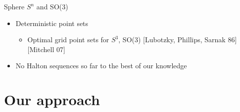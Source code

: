 \documentclass[10pt,ignorenonframetext,serif,onlymath]{beamer}
\providecommand{\tightlist}{%
  \setlength{\itemsep}{0pt}\setlength{\parskip}{0pt}}
\begin{document}
\begin{frame}{Sphere \(S^n\) and SO(3)}
\protect\hypertarget{sub:sphere_s_n_and_so_3_}{}

\begin{itemize}
\item
  Deterministic point sets

  \begin{itemize}
  \tightlist
  \item
    Optimal grid point sets for \(S^3\), SO(3) {[}Lubotzky, Phillips,
    Sarnak 86{]} {[}Mitchell 07{]}
  \end{itemize}
\item
  No Halton sequences so far to the best of our knowledge
\end{itemize}

\end{frame}

\hypertarget{our-approach}{%
\section{Our approach}\label{our-approach}}
\end{document}
